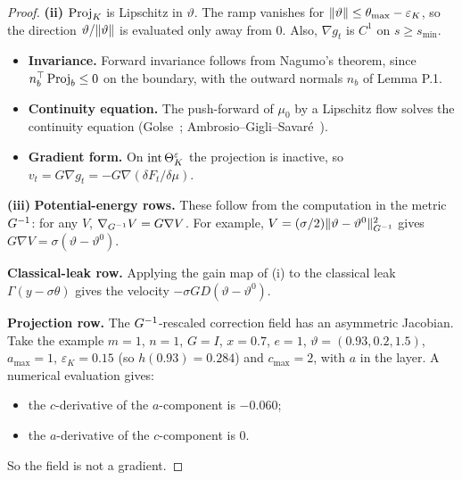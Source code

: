 \begin{proof}
\textbf{(ii)} $\operatorname{Proj}_K$ is Lipschitz in $\vartheta$. The ramp vanishes for
$\lVert \vartheta\rVert\le\theta_{\max}-\varepsilon_K$, so the direction $\vartheta/\lVert \vartheta\rVert$ is evaluated only away
from $0$. Also, $\nabla g_t$ is $C^1$ on $s\ge s_{\min}$.
\begin{itemize}
  \item \textbf{Invariance.} Forward invariance follows from Nagumo's theorem, since
    $n_b^\top\operatorname{Proj}_b\le 0$ on the boundary, with the outward normals $n_b$ of Lemma P.1.
  \item \textbf{Continuity equation.} The push-forward of $\mu_0$ by a Lipschitz flow solves the continuity equation
    (Golse~\cite{R82}; Ambrosio--Gigli--Savaré~\cite[\S8.1]{ags2008}).
  \item \textbf{Gradient form.} On $\operatorname{int}\Theta_K^{\varepsilon}$ the projection is inactive, so
    $v_t = G\nabla g_t = -G\nabla(\delta F_t/\delta\mu)$.
\end{itemize}

\textbf{(iii)} \textbf{Potential-energy rows.} These follow from the computation in the metric $G^{-1}$: for any $V$,
$\nabla_{G^{-1}}V = G\nabla V$. For example, $V = (\sigma/2)\lVert \vartheta-\vartheta^0\rVert_{G^{-1}}^2$ gives
$G\nabla V = \sigma(\vartheta-\vartheta^0)$.

\textbf{Classical-leak row.} Applying the gain map of (i) to the classical leak $\Gamma(y-\sigma\theta)$ gives the
velocity $-\sigma GD(\vartheta-\vartheta^0)$.

\textbf{Projection row.} The $G^{-1}$-rescaled correction field has an asymmetric Jacobian. Take the example $m = 1$,
$n = 1$, $G = I$, $x = 0.7$, $e = 1$, $\vartheta = (0.93, 0.2, 1.5)$, $a_{\max} = 1$, $\varepsilon_K = 0.15$ (so
$h(0.93) = 0.284$) and $c_{\max} = 2$, with $a$ in the layer. A numerical evaluation gives:
\begin{itemize}
  \item the $c$-derivative of the $a$-component is $-0.060$;
  \item the $a$-derivative of the $c$-component is $0$.
\end{itemize}
So the field is not a gradient.
\end{proof}

